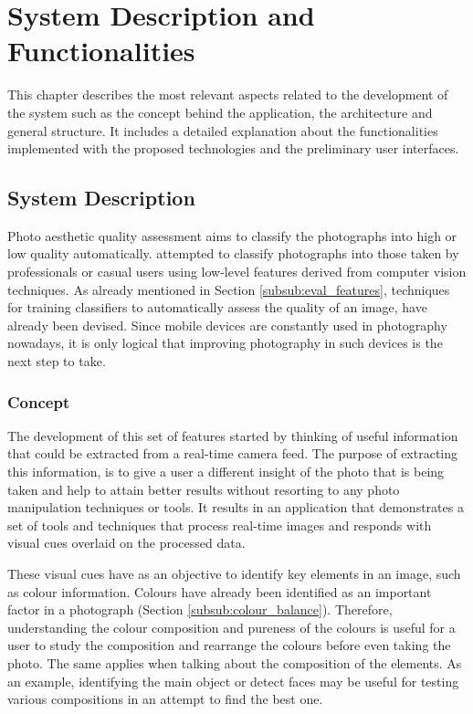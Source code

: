 
\chapter{System Description and Functionalities}
\label{cha:system}

This chapter describes the most relevant aspects related to the development of the system such as the concept behind the application, the architecture and general structure. It includes a detailed explanation about the functionalities implemented with the proposed technologies and the preliminary user interfaces.

\section{System Description}
\label{sec:system_description}

Photo aesthetic quality assessment aims to classify the photographs into high or low quality automatically. \citeauthor{tong2005classification} \cite{tong2005classification} attempted to classify photographs into those taken by professionals or casual users using low-level features derived from computer vision techniques. As already mentioned in Section \ref{subsub:eval_features}, techniques for training classifiers to automatically assess the quality of an image, have already been devised. Since mobile devices are constantly used in photography nowadays, it is only logical that improving photography in such devices is the next step to take.

\subsection{Concept}
The development of this set of features started by thinking of useful information that could be extracted from a real-time camera feed. The purpose of extracting this information, is to give a user a different insight of the photo that is being taken and help to attain better results without resorting to any photo manipulation techniques or tools. It results in an application that demonstrates a set of tools and techniques that process real-time images and responds with visual cues overlaid on the processed data.

These visual cues have as an objective to identify key elements in an image, such as colour information. Colours have already been identified as an important factor in a photograph (Section \ref{subsub:colour_balance}). Therefore, understanding the colour composition and pureness of the colours is useful for a user to study the composition and rearrange the colours before even taking the photo. The same applies when talking about the composition of the elements. As an example, identifying the main object or detect faces may be useful for testing various compositions in an attempt to find the best one.


